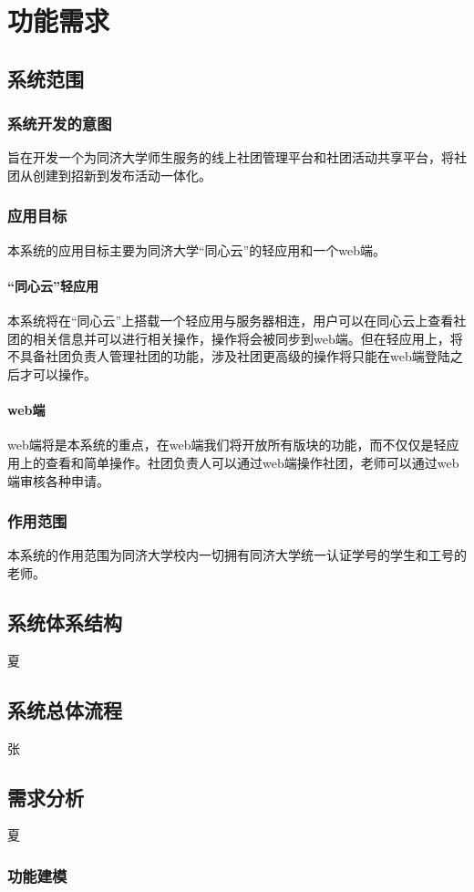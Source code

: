 \documentclass[UTF8]{ctexart}
\begin{document}
\section{功能需求}
\subsection{系统范围}
\subsubsection{系统开发的意图}
旨在开发一个为同济大学师生服务的线上社团管理平台和社团活动共享平台，将社团从创建到招新到发布活动一体化。
\subsubsection{应用目标}
本系统的应用目标主要为同济大学“同心云”的轻应用和一个web端。
\paragraph{“同心云”轻应用}
本系统将在“同心云”上搭载一个轻应用与服务器相连，用户可以在同心云上查看社团的相关信息并可以进行相关操作，操作将会被同步到web端。但在轻应用上，将不具备社团负责人管理社团的功能，涉及社团更高级的操作将只能在web端登陆之后才可以操作。
\paragraph{web端}
web端将是本系统的重点，在web端我们将开放所有版块的功能，而不仅仅是轻应用上的查看和简单操作。社团负责人可以通过web端操作社团，老师可以通过web端审核各种申请。

\subsubsection{作用范围}
本系统的作用范围为同济大学校内一切拥有同济大学统一认证学号的学生和工号的老师。
\subsection{系统体系结构}
夏
\subsection{系统总体流程}
张
\subsection{需求分析}
夏
\subsubsection{功能建模}
\end{document}
